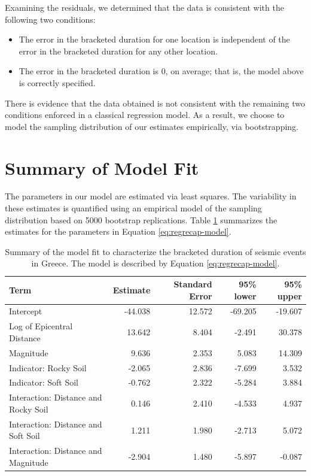 \documentclass[]{book}
\providecommand{\tightlist}{%
  \setlength{\itemsep}{0pt}\setlength{\parskip}{0pt}}
\theoremstyle{plain}
\theoremstyle{mydefn}
\theoremstyle{myexmpl}
\theoremstyle{remark}
\begin{document}
Examining the residuals, we determined that the data is consistent with
the following two conditions:

\begin{itemize}
\tightlist
\item
  The error in the bracketed duration for one location is independent of
  the error in the bracketed duration for any other location.
\item
  The error in the bracketed duration is 0, on average; that is, the
  model above is correctly specified.
\end{itemize}

There is evidence that the data obtained is not consistent with the
remaining two conditions enforced in a classical regression model. As a
result, we choose to model the sampling distribution of our estimates
empirically, via bootstrapping.

\section{Summary of Model Fit}\label{summary-of-model-fit}

The parameters in our model are estimated via least squares. The
variability in these estimates is quantified using an empirical model of
the sampling distribution based on 5000 bootstrap replications. Table
\ref{tab:regrecap-model-fit} summarizes the estimates for the parameters
in Equation \eqref{eq:regrecap-model}.





\begin{table}

\caption{\label{tab:regrecap-model-fit}Summary of the model fit to characterize
the bracketed duration of seismic events in Greece. The model is
described by Equation \eqref{eq:regrecap-model}.}
\centering
\begin{tabular}[t]{l|r|r|r|r}
\hline
Term & Estimate & Standard Error & 95\% lower & 95\% upper\\
\hline
Intercept & -44.038 & 12.572 & -69.205 & -19.607\\
\hline
Log of Epicentral Distance & 13.642 & 8.404 & -2.491 & 30.378\\
\hline
Magnitude & 9.636 & 2.353 & 5.083 & 14.309\\
\hline
Indicator: Rocky Soil & -2.065 & 2.836 & -7.699 & 3.532\\
\hline
Indicator: Soft Soil & -0.762 & 2.322 & -5.284 & 3.884\\
\hline
Interaction: Distance and Rocky Soil & 0.146 & 2.410 & -4.533 & 4.937\\
\hline
Interaction: Distance and Soft Soil & 1.211 & 1.980 & -2.713 & 5.072\\
\hline
Interaction: Distance and Magnitude & -2.904 & 1.480 & -5.897 & -0.087\\
\hline
\end{tabular}
\end{table}
\end{document}
